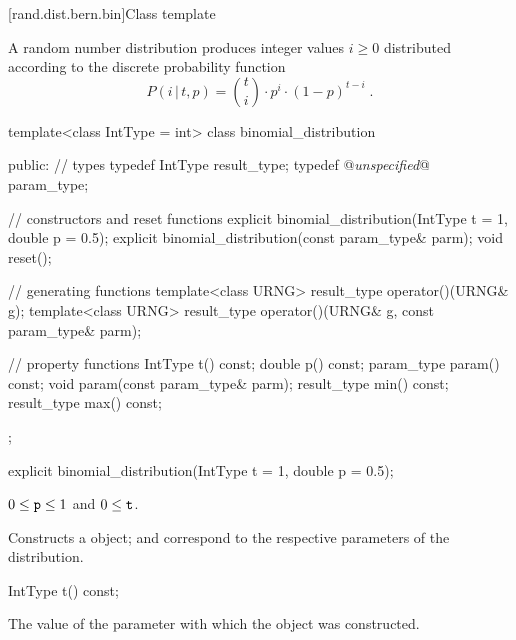 
[rand.dist.bern.bin]{Class template }%
%

\pnum
A  random number distribution
produces integer values $i \geq 0$
distributed according to
the discrete probability function%
%
\[%
 P(i\,|\,t,p)
      = {t \choose i} \cdot p^i \cdot (1-p)^{t-i}
\; \mbox{.}
\]

\begin{codeblock}
template<class IntType = int>
 class binomial_distribution
{
public:
 // types
 typedef IntType result_type;
 typedef @\textit{unspecified}@ param_type;

 // constructors and reset functions
 explicit binomial_distribution(IntType t = 1, double p = 0.5);
 explicit binomial_distribution(const param_type& parm);
 void reset();

 // generating functions
 template<class URNG>
   result_type operator()(URNG& g);
 template<class URNG>
   result_type operator()(URNG& g, const param_type& parm);

 // property functions
 IntType t() const;
 double p() const;
 param_type param() const;
 void param(const param_type& parm);
 result_type min() const;
 result_type max() const;
};
\end{codeblock}


%
\begin{itemdecl}
explicit binomial_distribution(IntType t = 1, double p = 0.5);
\end{itemdecl}

\begin{itemdescr}
\pnum\requires
 $0 \leq \texttt{p} \leq 1$ and $0 \leq \texttt{t} $.

\pnum\effects Constructs a  object;
  and 
 correspond to the respective parameters of the distribution.
\end{itemdescr}

%
%
\begin{itemdecl}
IntType t() const;
\end{itemdecl}%
\begin{itemdescr}
\pnum\returns The value of the  parameter
 with which the object was constructed.
\end{itemdescr}

